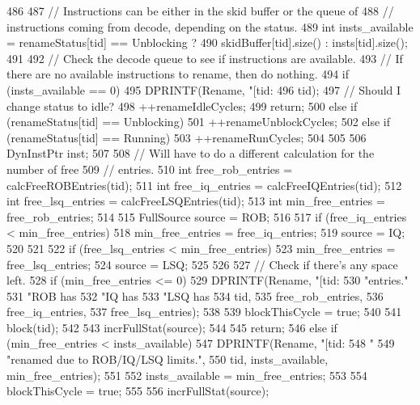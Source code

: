 \begin{DoxyCode}
486 {
487     // Instructions can be either in the skid buffer or the queue of
488     // instructions coming from decode, depending on the status.
489     int insts_available = renameStatus[tid] == Unblocking ?
490         skidBuffer[tid].size() : insts[tid].size();
491 
492     // Check the decode queue to see if instructions are available.
493     // If there are no available instructions to rename, then do nothing.
494     if (insts_available == 0) {
495         DPRINTF(Rename, "[tid:%
496                 tid);
497         // Should I change status to idle?
498         ++renameIdleCycles;
499         return;
500     } else if (renameStatus[tid] == Unblocking) {
501         ++renameUnblockCycles;
502     } else if (renameStatus[tid] == Running) {
503         ++renameRunCycles;
504     }
505 
506     DynInstPtr inst;
507 
508     // Will have to do a different calculation for the number of free
509     // entries.
510     int free_rob_entries = calcFreeROBEntries(tid);
511     int free_iq_entries  = calcFreeIQEntries(tid);
512     int free_lsq_entries = calcFreeLSQEntries(tid);
513     int min_free_entries = free_rob_entries;
514 
515     FullSource source = ROB;
516 
517     if (free_iq_entries < min_free_entries) {
518         min_free_entries = free_iq_entries;
519         source = IQ;
520     }
521 
522     if (free_lsq_entries < min_free_entries) {
523         min_free_entries = free_lsq_entries;
524         source = LSQ;
525     }
526 
527     // Check if there's any space left.
528     if (min_free_entries <= 0) {
529         DPRINTF(Rename, "[tid:%
530                 "entries.\n"
531                 "ROB has %
532                 "IQ has %
533                 "LSQ has %
534                 tid,
535                 free_rob_entries,
536                 free_iq_entries,
537                 free_lsq_entries);
538 
539         blockThisCycle = true;
540 
541         block(tid);
542 
543         incrFullStat(source);
544 
545         return;
546     } else if (min_free_entries < insts_available) {
547         DPRINTF(Rename, "[tid:%
548                 "%
549                 "renamed due to ROB/IQ/LSQ limits.\n",
550                 tid, insts_available, min_free_entries);
551 
552         insts_available = min_free_entries;
553 
554         blockThisCycle = true;
555 
556         incrFullStat(source);
}}
\end{DoxyCode}
